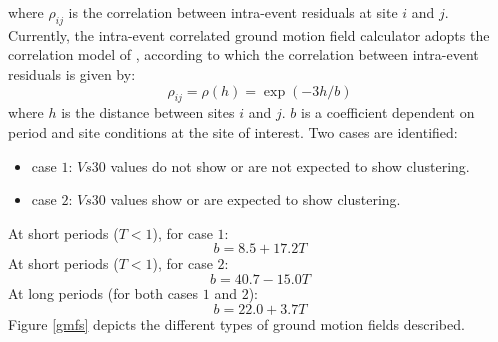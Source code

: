 where $\rho_{ij}$ is the correlation between intra-event residuals at site $i$ and $j$.\\
Currently, the intra-event correlated ground motion field calculator adopts the correlation model of \citet{jayaram2009}, according to which the correlation between intra-event residuals is given by:
 \begin{equation}
 \rho_{ij} = \rho(h) = \exp(-3h/b)
 \end{equation}
 where $h$ is the distance between sites $i$ and $j$. $b$ is a coefficient dependent on period and site conditions at the site of interest. Two cases are identified:
 \begin{itemize}
 \item case $1$:  $Vs30$ values do not show or are not expected to show clustering.
 \item case $2$: $Vs30$ values show or are expected to show clustering.
 \end{itemize}
At short periods ($T<1$), for case $1$:
\begin{equation}
b = 8.5 + 17.2T
\end{equation}
At short periods ($T<1$), for case $2$:
\begin{equation}
b = 40.7 - 15.0T
\end{equation}
At long periods (for both cases $1$ and $2$):
\begin{equation}
b = 22.0 + 3.7T
\end{equation}
Figure \ref{gmfs} depicts the different types of ground motion fields described.\\
